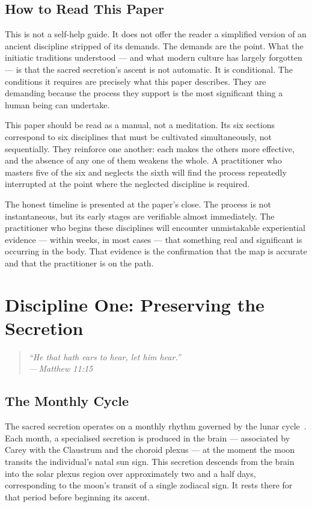 \documentclass[12pt, a4paper]{article}
\newcommand{\epigraph}[2]{%
  \begin{quote}
    \itshape ``#1''\\[0.3em]
    \normalfont\small\hfill ---\,#2
  \end{quote}
}
\begin{document}
\subsection{How to Read This Paper}

This is not a self-help guide. It does not offer the reader a simplified
version of an ancient discipline stripped of its demands. The demands are the
point. What the initiatic traditions understood — and what modern culture has
largely forgotten — is that the sacred secretion's ascent is not automatic. It
is conditional. The conditions it requires are precisely what this paper
describes. They are demanding because the process they support is the most
significant thing a human being can undertake.

This paper should be read as a manual, not a meditation. Its six sections
correspond to six disciplines that must be cultivated simultaneously, not
sequentially. They reinforce one another: each makes the others more
effective, and the absence of any one of them weakens the whole. A practitioner
who masters five of the six and neglects the sixth will find the process
repeatedly interrupted at the point where the neglected discipline is required.

The honest timeline is presented at the paper's close. The process is not
instantaneous, but its early stages are verifiable almost immediately. The
practitioner who begins these disciplines will encounter unmistakable
experiential evidence — within weeks, in most cases — that something real and
significant is occurring in the body. That evidence is the confirmation that
the map is accurate and that the practitioner is on the path.

\section{Discipline One: Preserving the Secretion}
\label{sec:preservation}

\epigraph{He that hath ears to hear, let him hear.}{Matthew 11:15}

\subsection{The Monthly Cycle}

The sacred secretion operates on a monthly rhythm governed by the lunar
cycle~\autocite{carey1932}. Each month, a specialised secretion is produced in
the brain — associated by Carey with the Claustrum and the choroid plexus —
at the moment the moon transits the individual's natal sun sign. This
secretion descends from the brain into the solar plexus region over
approximately two and a half days, corresponding to the moon's transit of a
single zodiacal sign. It rests there for that period before beginning its
ascent.
\end{document}
